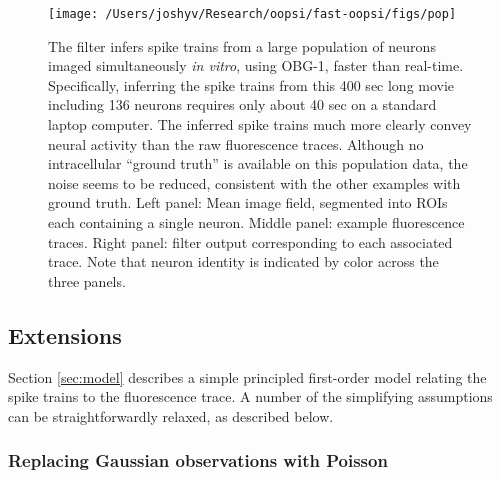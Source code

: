 \begin{figure}[h!]
\begin{centering} 
\texttt{[image: /Users/joshyv/Research/oopsi/fast-oopsi/figs/pop]}
\end{centering}
\caption[\foopsi filter is robust and works online for populations of neurons]{The \foopsi filter infers spike trains from a large population of neurons imaged simultaneously \emph{in vitro}, using OBG-1, faster than real-time.  Specifically, inferring the spike trains from this 400 sec long movie including 136 neurons requires only about 40 sec on a standard laptop computer. The inferred spike trains much more clearly convey neural activity than the raw fluorescence traces.  Although no intracellular ``ground truth'' is available on this population data, the noise seems to be reduced, consistent with the other examples with ground truth.  Left panel: Mean image field, segmented into ROIs each containing a single neuron.  Middle panel: example fluorescence traces.  Right panel: \foopsi filter output corresponding to each associated trace. Note that neuron identity is indicated by color across the three panels.} \label{fig:pop}
\end{figure}


\subsection{Extensions}

Section \ref{sec:model} describes a simple principled first-order model relating the spike trains to the fluorescence trace. A number of the simplifying assumptions can be straightforwardly relaxed, as described below.


\subsubsection{Replacing Gaussian observations with Poisson}

